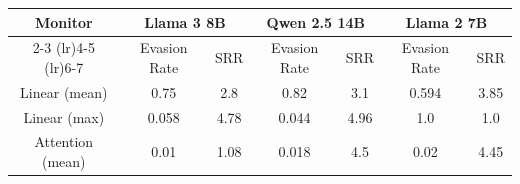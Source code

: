 \begin{tabular}{ccccccc}
\toprule
\multicolumn{1}{c}{Monitor} &
\multicolumn{2}{c}{Llama 3 8B} &
\multicolumn{2}{c}{Qwen 2.5 14B} &
\multicolumn{2}{c}{Llama 2 7B} \\
\cmidrule(lr){2-3}
\cmidrule(lr){4-5}
\cmidrule(lr){6-7}
&
\multicolumn{1}{c}{Evasion Rate } &
\multicolumn{1}{c}{SRR } &
\multicolumn{1}{c}{Evasion Rate } &
\multicolumn{1}{c}{SRR } &
\multicolumn{1}{c}{Evasion Rate } &
\multicolumn{1}{c}{SRR } \\
\midrule
Linear (mean)    & 0.75 & 2.8 & 0.82 & 3.1 & 0.594 & 3.85 \\
Linear (max)     & 0.058 & 4.78 & 0.044 & 4.96 & 1.0 & 1.0 \\
Attention (mean) & 0.01 & 1.08 & 0.018 & 4.5 & 0.02 & 4.45 \\
\bottomrule
\end{tabular}
